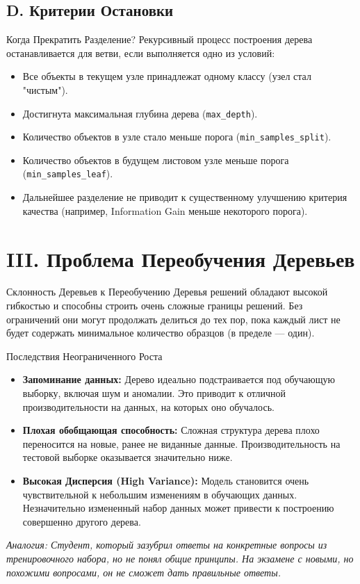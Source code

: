 \subsection{D. Критерии Остановки}
\begin{myexampleblock}{Когда Прекратить Разделение?}
    Рекурсивный процесс построения дерева останавливается для ветви, если выполняется одно из условий:
    \begin{itemize}[nosep, leftmargin=*]
        \item Все объекты в текущем узле принадлежат одному классу (узел стал "чистым").
        \item Достигнута максимальная глубина дерева (\texttt{max\_depth}).
        \item Количество объектов в узле стало меньше порога (\texttt{min\_samples\_split}).
        \item Количество объектов в будущем листовом узле меньше порога (\texttt{min\_samples\_leaf}).
        \item Дальнейшее разделение не приводит к существенному улучшению критерия качества (например, Information Gain меньше некоторого порога).
    \end{itemize}
\end{myexampleblock}

\section{III. Проблема Переобучения Деревьев}

\begin{alerttextbox}{Склонность Деревьев к Переобучению}
    Деревья решений обладают высокой гибкостью и способны строить очень сложные границы решений. Без ограничений они могут продолжать делиться до тех пор, пока каждый лист не будет содержать минимальное количество образцов (в пределе — один).
\end{alerttextbox}

\begin{myblock}{Последствия Неограниченного Роста}
    \begin{itemize}[nosep, leftmargin=*]
        \item \textbf{Запоминание данных:} Дерево идеально подстраивается под обучающую выборку, включая шум и аномалии. Это приводит к отличной производительности на данных, на которых оно обучалось.
        \item \textbf{Плохая обобщающая способность:} Сложная структура дерева плохо переносится на новые, ранее не виданные данные. Производительность на тестовой выборке оказывается значительно ниже.
        \item \textbf{Высокая Дисперсия (High Variance):} Модель становится очень чувствительной к небольшим изменениям в обучающих данных. Незначительно измененный набор данных может привести к построению совершенно другого дерева.
    \end{itemize}
    \textit{Аналогия: Студент, который зазубрил ответы на конкретные вопросы из тренировочного набора, но не понял общие принципы. На экзамене с новыми, но похожими вопросами, он не сможет дать правильные ответы.}
\end{myblock}

